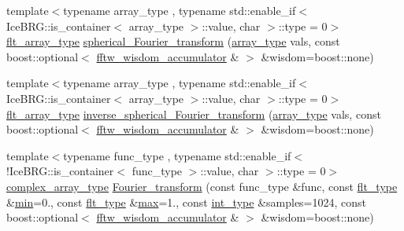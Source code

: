 \begin{DoxyCompactItemize}
\item 
{\footnotesize template$<$typename array\+\_\+type , typename std\+::enable\+\_\+if$<$ Ice\+B\+R\+G\+::is\+\_\+container$<$ array\+\_\+type $>$\+::value, char $>$\+::type  = 0$>$ }\\\hyperlink{namespaceIceBRG_acdca5c05302480eba6ba053449643a6d}{flt\+\_\+array\+\_\+type} \hyperlink{namespaceIceBRG_1_1Fourier_a97aa6b3ec3f4fe380be476a24f613cfc}{spherical\+\_\+\+Fourier\+\_\+transform} (\hyperlink{main__lensing__model__fitter_8cpp_ad3282ec06f468e9f4cb74fee9155540e}{array\+\_\+type} vals, const boost\+::optional$<$ \hyperlink{classIceBRG_1_1Fourier_1_1fftw__wisdom__accumulator}{fftw\+\_\+wisdom\+\_\+accumulator} \& $>$ \&wisdom=boost\+::none)
\item 
{\footnotesize template$<$typename array\+\_\+type , typename std\+::enable\+\_\+if$<$ Ice\+B\+R\+G\+::is\+\_\+container$<$ array\+\_\+type $>$\+::value, char $>$\+::type  = 0$>$ }\\\hyperlink{namespaceIceBRG_acdca5c05302480eba6ba053449643a6d}{flt\+\_\+array\+\_\+type} \hyperlink{namespaceIceBRG_1_1Fourier_afabdc17609e1191649e571a21dbe3c13}{inverse\+\_\+spherical\+\_\+\+Fourier\+\_\+transform} (\hyperlink{main__lensing__model__fitter_8cpp_ad3282ec06f468e9f4cb74fee9155540e}{array\+\_\+type} vals, const boost\+::optional$<$ \hyperlink{classIceBRG_1_1Fourier_1_1fftw__wisdom__accumulator}{fftw\+\_\+wisdom\+\_\+accumulator} \& $>$ \&wisdom=boost\+::none)
\item 
{\footnotesize template$<$typename func\+\_\+type , typename std\+::enable\+\_\+if$<$!\+Ice\+B\+R\+G\+::is\+\_\+container$<$ func\+\_\+type $>$\+::value, char $>$\+::type  = 0$>$ }\\\hyperlink{namespaceIceBRG_a02e79930ea75411b7883d2786b2fc5d7}{complex\+\_\+array\+\_\+type} \hyperlink{namespaceIceBRG_1_1Fourier_a129c362c44c64c7e1e303abcf96f55e9}{Fourier\+\_\+transform} (const func\+\_\+type \&func, const \hyperlink{lib_2IceBRG__main_2common_8h_ad0f130a56eeb944d9ef2692ee881ecc4}{flt\+\_\+type} \&\hyperlink{namespaceIceBRG_aa6b6fb2d7875bb865ebaf20c5c9cbc85}{min}=0., const \hyperlink{lib_2IceBRG__main_2common_8h_ad0f130a56eeb944d9ef2692ee881ecc4}{flt\+\_\+type} \&\hyperlink{namespaceIceBRG_af8123f867f9a8c6a9703da8556182c84}{max}=1., const \hyperlink{lib_2IceBRG__main_2common_8h_ac4de9d9335536ac22821171deec8d39e}{int\+\_\+type} \&samples=1024, const boost\+::optional$<$ \hyperlink{classIceBRG_1_1Fourier_1_1fftw__wisdom__accumulator}{fftw\+\_\+wisdom\+\_\+accumulator} \& $>$ \&wisdom=boost\+::none)
\item 

\end{DoxyCompactItemize}
